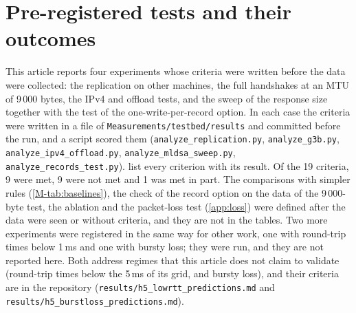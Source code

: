 \documentclass[preprint,12pt]{elsarticle}
\newcommand{\ms}{\,ms\xspace}
\begin{document}
\section{Pre-registered tests and their outcomes}
\label{app:prereg}
This article reports four experiments whose criteria were written before the data were collected: the replication on other machines, the full handshakes at an MTU of 9\,000 bytes, the IPv4 and offload tests, and the sweep of the response size together with the test of the one-write-per-record option. In each case the criteria were written in a file of \texttt{Measurements/\allowbreak testbed/\allowbreak results} and committed before the run, and a script scored them (\texttt{analyze\_\allowbreak replication.py}, \texttt{analyze\_\allowbreak g3b.py}, \texttt{analyze\_\allowbreak ipv4\_\allowbreak offload.py}, \texttt{analyze\_\allowbreak mldsa\_\allowbreak sweep.py}, \texttt{analyze\_\allowbreak records\_\allowbreak test.py}).  list every criterion with its result. Of the 19 criteria, 9 were met, 9 were not met and 1 was met in part. The comparisons with simpler rules (\cref{M-tab:baselines}), the check of the record option on the data of the 9\,000-byte test, the ablation and the packet-loss test (\cref{app:loss}) were defined after the data were seen or without criteria, and they are not in the tables. Two more experiments were registered in the same way for other work, one with round-trip times below 1\ms and one with bursty loss; they were run, and they are not reported here. Both address regimes that this article does not claim to validate (round-trip times below the 5\ms of its grid, and bursty loss), and their criteria are in the repository (\texttt{results/h5\_\allowbreak lowrtt\_\allowbreak predictions.md} and \texttt{results/h5\_\allowbreak burstloss\_\allowbreak predictions.md}).
\end{document}
